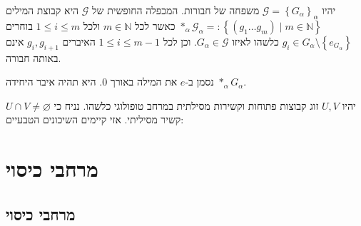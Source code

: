 \documentclass{tstextbook}
\begin{document}
\begin{definition}
יהיו \(\mathcal{G}=\left\{  G_{\alpha}  \right\}_{\alpha}\) משפחה של חבורות. המכפלה החופשית של \(\mathcal{G}\) היא קבוצת המילים \(*_{\alpha}\mathcal{G}_{\alpha}=: \left\{  \left( g_{1}\dots g_{m} \right)\mid m \in \mathbb{N}  \right\}\) כאשר לכל \(m \in \mathbb{N}\) ולכל \(1\leq i\leq m\) בוחרים \(g_{i}\in G_{\alpha}\setminus \left\{  e_{G_{\alpha}}  \right\}\) כלשהו לאיזו \(G_{\alpha}\in \mathcal{G}\). וכן לכל \(1\leq i \leq m-1\) האיברים \(g_{i},g_{i+1}\) אינם באותה חבורה.

\end{definition}
\begin{symbolize}
נסמן ב-\(e\) את המילה באורך 0. היא תהיה איבר היחידה \(*_{\alpha}G_{\alpha}\). 

\end{symbolize}
\begin{theorem}
יהיו \(U,V\) זוג קבוצות פתוחות וקשירות מסילתית במרחב טופולוגי כלשהו. נניח כי \(U\cap V\neq \varnothing\) קשיר מסיליתי. אזי קיימים השיכונים הטבעיים:

\end{theorem}
\chapter{מרחבי כיסוי}

\section{מרחבי כיסוי}
\end{document}
